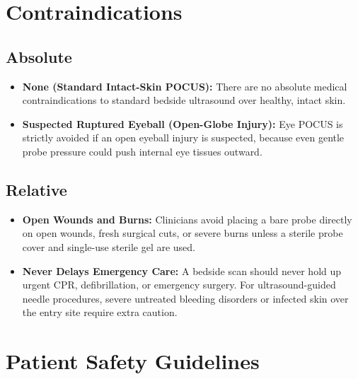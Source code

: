 \section{Contraindications}

\subsection{Absolute}

\begin{itemize}
    \item \textbf{None (Standard Intact-Skin POCUS):} There are no absolute medical contraindications to standard bedside ultrasound over healthy, intact skin.
    \item \textbf{Suspected Ruptured Eyeball (Open-Globe Injury):} Eye POCUS is strictly avoided if an open eyeball injury is suspected, because even gentle probe pressure could push internal eye tissues outward.
\end{itemize}

\subsection{Relative}

\begin{itemize}
    \item \textbf{Open Wounds and Burns:} Clinicians avoid placing a bare probe directly on open wounds, fresh surgical cuts, or severe burns unless a sterile probe cover and single-use sterile gel are used.
    \item \textbf{Never Delays Emergency Care:} A bedside scan should never hold up urgent CPR, defibrillation, or emergency surgery. For ultrasound-guided needle procedures, severe untreated bleeding disorders or infected skin over the entry site require extra caution.
\end{itemize}

\section{Patient Safety Guidelines}

